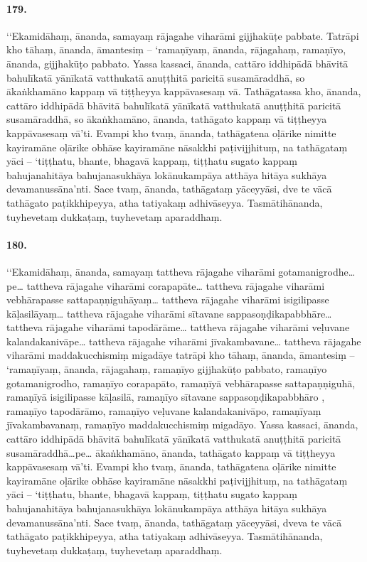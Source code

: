 \paragraph{179.} ‘‘Ekamidāhaṃ, ānanda, samayaṃ rājagahe viharāmi gijjhakūṭe pabbate. Tatrāpi kho tāhaṃ, ānanda, āmantesiṃ – ‘ramaṇīyaṃ, ānanda, rājagahaṃ, ramaṇīyo, ānanda, gijjhakūṭo pabbato. Yassa kassaci, ānanda, cattāro iddhipādā bhāvitā bahulīkatā yānīkatā vatthukatā anuṭṭhitā paricitā susamāraddhā, so ākaṅkhamāno kappaṃ vā tiṭṭheyya kappāvasesaṃ vā. Tathāgatassa kho, ānanda, cattāro iddhipādā bhāvitā bahulīkatā yānīkatā vatthukatā anuṭṭhitā paricitā susamāraddhā, so ākaṅkhamāno, ānanda, tathāgato kappaṃ vā tiṭṭheyya kappāvasesaṃ vā’ti. Evampi kho tvaṃ, ānanda, tathāgatena oḷārike nimitte kayiramāne oḷārike obhāse kayiramāne nāsakkhi paṭivijjhituṃ, na tathāgataṃ yāci – ‘tiṭṭhatu, bhante, bhagavā kappaṃ, tiṭṭhatu sugato kappaṃ bahujanahitāya bahujanasukhāya lokānukampāya atthāya hitāya sukhāya devamanussāna’nti. Sace tvaṃ, ānanda, tathāgataṃ yāceyyāsi, dve te vācā tathāgato paṭikkhipeyya, atha tatiyakaṃ adhivāseyya. Tasmātihānanda, tuyhevetaṃ dukkaṭaṃ, tuyhevetaṃ aparaddhaṃ.

\paragraph{180.} ‘‘Ekamidāhaṃ, ānanda, samayaṃ tattheva rājagahe viharāmi gotamanigrodhe…pe… tattheva rājagahe viharāmi corapapāte… tattheva rājagahe viharāmi vebhārapasse sattapaṇṇiguhāyaṃ… tattheva rājagahe viharāmi isigilipasse kāḷasilāyaṃ… tattheva rājagahe viharāmi sītavane sappasoṇḍikapabbhāre… tattheva rājagahe viharāmi tapodārāme… tattheva rājagahe viharāmi veḷuvane kalandakanivāpe… tattheva rājagahe viharāmi jīvakambavane… tattheva rājagahe viharāmi maddakucchismiṃ migadāye tatrāpi kho tāhaṃ, ānanda, āmantesiṃ – ‘ramaṇīyaṃ, ānanda, rājagahaṃ, ramaṇīyo gijjhakūṭo pabbato, ramaṇīyo gotamanigrodho, ramaṇīyo corapapāto, ramaṇīyā vebhārapasse sattapaṇṇiguhā, ramaṇīyā isigilipasse kāḷasilā, ramaṇīyo sītavane sappasoṇḍikapabbhāro , ramaṇīyo tapodārāmo, ramaṇīyo veḷuvane kalandakanivāpo, ramaṇīyaṃ jīvakambavanaṃ, ramaṇīyo maddakucchismiṃ migadāyo. Yassa kassaci, ānanda, cattāro iddhipādā bhāvitā bahulīkatā yānīkatā vatthukatā anuṭṭhitā paricitā susamāraddhā…pe… ākaṅkhamāno, ānanda, tathāgato kappaṃ vā tiṭṭheyya kappāvasesaṃ vā’ti. Evampi kho tvaṃ, ānanda, tathāgatena oḷārike nimitte kayiramāne oḷārike obhāse kayiramāne nāsakkhi paṭivijjhituṃ, na tathāgataṃ yāci – ‘tiṭṭhatu, bhante, bhagavā kappaṃ, tiṭṭhatu sugato kappaṃ bahujanahitāya bahujanasukhāya lokānukampāya atthāya hitāya sukhāya devamanussāna’nti. Sace tvaṃ, ānanda, tathāgataṃ yāceyyāsi, dveva te vācā tathāgato paṭikkhipeyya, atha tatiyakaṃ adhivāseyya. Tasmātihānanda, tuyhevetaṃ dukkaṭaṃ, tuyhevetaṃ aparaddhaṃ.

